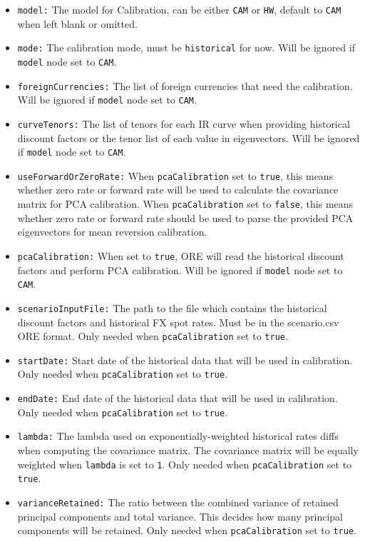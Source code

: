 \begin{itemize}
\item {\tt model:} The model for Calibration, can be either {\tt CAM} or {\tt HW}, default to {\tt CAM} when left blank or omitted.
\item {\tt mode:} The calibration mode, must be {\tt historical} for now. Will be ignored if {\tt model} node set to {\tt CAM}.
\item {\tt foreignCurrencies:} The list of foreign currencies that need the calibration. Will be ignored if {\tt model} node set to {\tt CAM}.
\item {\tt curveTenors:} The list of tenors for each IR curve when providing historical discount factors or the tenor list of each value in eigenvectors. Will be ignored if {\tt model} node set to {\tt CAM}.
\item {\tt useForwardOrZeroRate:} When {\tt pcaCalibration} set to {\tt true}, this means whether zero rate or forward rate will be used to calculate the covariance matrix for PCA calibration. When {\tt pcaCalibration} set to {\tt false}, this means whether zero rate or forward rate should be used to parse the provided PCA eigenvectors for mean reversion calibration.
\item {\tt pcaCalibration:} When set to {\tt true}, ORE will read the historical discount factors and perform PCA calibration. Will be ignored if {\tt model} node set to {\tt CAM}.
\item {\tt scenarioInputFile:} The path to the file which contains the historical discount factors and historical FX spot rates. Must be in the scenario.csv ORE format. Only needed when {\tt pcaCalibration} set to {\tt true}.
\item {\tt startDate:} Start date of the historical data that will be used in calibration. Only needed when {\tt pcaCalibration} set to {\tt true}.
\item {\tt endDate:} End date of the historical data that will be used in calibration. Only needed when {\tt pcaCalibration} set to {\tt true}.
\item {\tt lambda:} The lambda used on exponentially-weighted historical rates diffs when computing the covariance matrix. The covariance matrix will be equally weighted when {\tt lambda} is set to {\tt 1}. Only needed when {\tt pcaCalibration} set to {\tt true}.
\item {\tt varianceRetained:} The ratio between the combined variance of retained principal components and total variance. This decides how many principal components will be retained. Only needed when {\tt pcaCalibration} set to {\tt true}.

\end{itemize}
